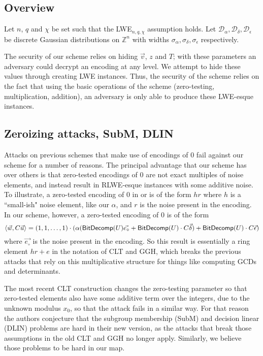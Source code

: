 \subsection{Overview}

Let $n$, $q$ and $\chi$ be set such that the LWE$_{n,q,\chi}$ assumption holds.  Let $\mathcal{D}_\alpha, \mathcal{D}_\delta, \mathcal{D}_\epsilon$ be discrete Gaussian distributions on $\mathbb{Z}^n$ with widths $\sigma_\alpha, \sigma_\delta, \sigma_\epsilon$ respectively.

The security of our scheme relies on hiding $\vec{v}$, $z$ and $T$; with these parameters an adversary could decrypt an encoding at any level.  We attempt to hide these values through creating LWE instances.  Thus, the security of the scheme relies on the fact that using the basic operations of the scheme (zero-testing, multiplication, addition), an adversary is only able to produce these LWE-esque instances.  

\subsection{Zeroizing attacks, SubM, DLIN}
Attacks on previous schemes \cite{chl,cgh,hj} that make use of encodings of 0 fail against our scheme for a number of reasons. The principal advantage that our scheme has over others is that zero-tested encodings of $0$ are not exact multiples of noise elements, and instead result in RLWE-esque instances with some additive noise.  To illustrate, a zero-tested encoding of $0$ in \cite{clt} or \cite{ggh13a} is of the form $hr$ where $h$ is a ``small-ish" noise element, like our $\alpha$, and $r$ is the noise present in the encoding.  In our scheme, however, a zero-tested encoding of $0$ is of the form
$$\left<\vec{w}, C \vec{u}\right> = (1,1,\ldots, 1)\cdot(\alpha (\mathsf{BitDecomp}(U)\vec{e_{\circ}} + \mathsf{BitDecomp}(U)\cdot C\vec{\delta}) + \mathsf{BitDecomp}(U)\cdot C\vec{\epsilon})$$
where $\vec{e_{\circ}}$ is the noise present in the encoding.  So this result is essentially a ring element $hr + e$ in the notation of CLT and GGH, which breaks the previous attacks that rely on this multiplicative structure for things like computing GCDs and determinants. 

The most recent CLT construction \cite{clt15} changes the zero-testing parameter so that zero-tested elements also have some additive term over the integers, due to the unknown modulus $x_0$, so that the attack fails in a similar way.  For that reason the authors conjecture that the subgroup membership (SubM) and decision linear (DLIN) problems are hard in their new version, as the attacks that break those assumptions in the old CLT and GGH no longer apply.  Similarly, we believe those problems to be hard in our map.

